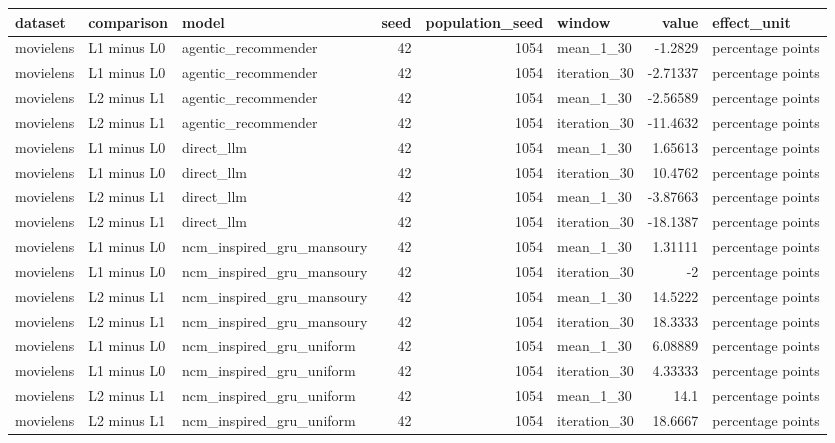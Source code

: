\begin{table}[htbp!]
\centering
\small
\setlength{\tabcolsep}{3pt}
\renewcommand{\arraystretch}{1.1}
\begin{tabular}{lllrrlrl}
\hline
dataset & comparison & model & seed & population\_seed & window & value & effect\_unit \\
\hline
movielens & L1 minus L0 & agentic\_recommender & 42 & 1054 & mean\_1\_30 & -1.2829 & percentage points \\
movielens & L1 minus L0 & agentic\_recommender & 42 & 1054 & iteration\_30 & -2.71337 & percentage points \\
movielens & L2 minus L1 & agentic\_recommender & 42 & 1054 & mean\_1\_30 & -2.56589 & percentage points \\
movielens & L2 minus L1 & agentic\_recommender & 42 & 1054 & iteration\_30 & -11.4632 & percentage points \\
movielens & L1 minus L0 & direct\_llm & 42 & 1054 & mean\_1\_30 & 1.65613 & percentage points \\
movielens & L1 minus L0 & direct\_llm & 42 & 1054 & iteration\_30 & 10.4762 & percentage points \\
movielens & L2 minus L1 & direct\_llm & 42 & 1054 & mean\_1\_30 & -3.87663 & percentage points \\
movielens & L2 minus L1 & direct\_llm & 42 & 1054 & iteration\_30 & -18.1387 & percentage points \\
movielens & L1 minus L0 & ncm\_inspired\_gru\_mansoury & 42 & 1054 & mean\_1\_30 & 1.31111 & percentage points \\
movielens & L1 minus L0 & ncm\_inspired\_gru\_mansoury & 42 & 1054 & iteration\_30 & -2 & percentage points \\
movielens & L2 minus L1 & ncm\_inspired\_gru\_mansoury & 42 & 1054 & mean\_1\_30 & 14.5222 & percentage points \\
movielens & L2 minus L1 & ncm\_inspired\_gru\_mansoury & 42 & 1054 & iteration\_30 & 18.3333 & percentage points \\
movielens & L1 minus L0 & ncm\_inspired\_gru\_uniform & 42 & 1054 & mean\_1\_30 & 6.08889 & percentage points \\
movielens & L1 minus L0 & ncm\_inspired\_gru\_uniform & 42 & 1054 & iteration\_30 & 4.33333 & percentage points \\
movielens & L2 minus L1 & ncm\_inspired\_gru\_uniform & 42 & 1054 & mean\_1\_30 & 14.1 & percentage points \\
movielens & L2 minus L1 & ncm\_inspired\_gru\_uniform & 42 & 1054 & iteration\_30 & 18.6667 & percentage points \\

\end{tabular}
\end{table}
